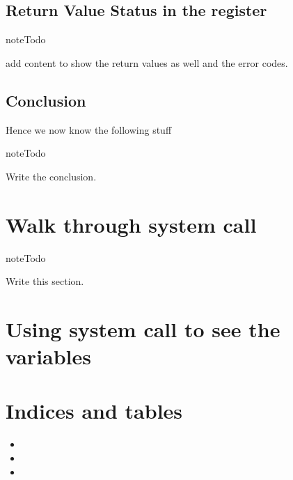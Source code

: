 \documentclass[letterpaper,10pt,english]{sphinxmanual}
\begin{document}
\section{Return Value Status in the register}
\label{\detokenize{08_return_values:return-value-status-in-the-register}}
\begin{sphinxadmonition}{note}{Todo}

add content to show the return values as well and the error codes.
\end{sphinxadmonition}


\section{Conclusion}
\label{\detokenize{08_return_values:conclusion}}
Hence we now know the following stuff

\begin{sphinxadmonition}{note}{Todo}

Write the conclusion.
\end{sphinxadmonition}


\chapter{Walk through  system call}
\label{\detokenize{11_appendix:walk-through-write-system-call}}\label{\detokenize{11_appendix::doc}}
\begin{sphinxadmonition}{note}{Todo}

Write this section.
\end{sphinxadmonition}


\chapter{Using  system call to see the variables}
\label{\detokenize{12_appendix::doc}}\label{\detokenize{12_appendix:using-ptrace-system-call-to-see-the-variables}}

\chapter{Indices and tables}
\label{\detokenize{index:indices-and-tables}}\begin{itemize}
\item {} 

\item {} 

\item {} 

\end{itemize}



\renewcommand{\indexname}{Index}
\printindex
\end{document}
